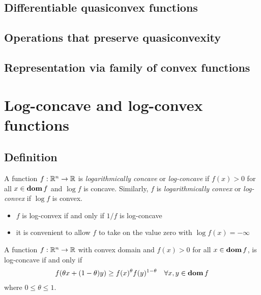 \subsection{Differentiable quasiconvex functions}

\subsection{Operations that preserve quasiconvexity}
\begin{example}
\end{example}

\subsection{Representation via family of convex functions}
\begin{example}
\end{example}

\section{Log-concave and log-convex functions}

\subsection{Definition}
A function $f:\mathbb{R}^n\rightarrow \mathbb{R}$ is \textit{logarithmically concave} or \textit{log-concave} if $f(x)>0$ for all $x\in\mathop{\bf dom} f$ and $\log f$ is concave.
Similarly, $f$ is \textit{logarithmically convex} or \textit{log-convex} if $\log f$ is convex.
\begin{itemize}
  \item $f$ is log-convex if and only if $1/f$ is log-concave
  \item it is convenient to allow $f$ to take on the value zero with $\log f(x)=-\infty$
\end{itemize}\par
A function $f:\mathbb{R}^n\rightarrow \mathbb{R}$ with convex domain and $f(x)>0$ for all $x\in\mathop{\bf dom} f$, is log-concave if and only if
\begin{align*}
  f(\theta x+(1-\theta)y)\ge f(x)^\theta f(y)^{1-\theta}\quad\forall x,y\in\mathop{\bf dom} f
\end{align*}
where $0\le\theta\le 1$.
\begin{example}
\end{example}
\begin{example}
\end{example}

